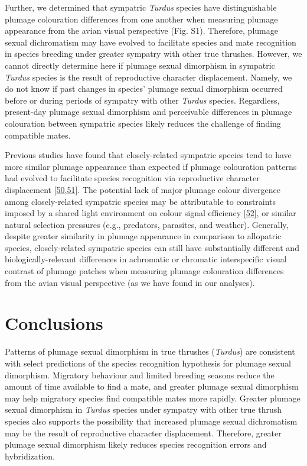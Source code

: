 \documentclass[
  a4paper,
]{article}
\begin{document}
Further, we determined that sympatric \emph{Turdus} species have
distinguishable plumage colouration differences from one another when
measuring plumage appearance from the avian visual perspective (Fig.
S1). Therefore, plumage sexual dichromatism may have evolved to
facilitate species and mate recognition in species breeding under
greater sympatry with other true thrushes. However, we cannot directly
determine here if plumage sexual dimorphism in sympatric \emph{Turdus}
species is the result of reproductive character displacement. Namely, we
do not know if past changes in species' plumage sexual dimorphism
occurred before or during periods of sympatry with other \emph{Turdus}
species. Regardless, present-day plumage sexual dimorphism and
perceivable differences in plumage colouration between sympatric species
likely reduces the challenge of finding compatible mates.

Previous studies have found that closely-related sympatric species tend
to have more similar plumage appearance than expected if plumage
colouration patterns had evolved to facilitate species recognition via
reproductive character displacement
{[}\protect\hyperlink{ref-simpson2021}{50},\protect\hyperlink{ref-miller2019}{51}{]}.
The potential lack of major plumage colour divergence among
closely-related sympatric species may be attributable to constraints
imposed by a shared light environment on colour signal efficiency
{[}\protect\hyperlink{ref-mcnaught2002}{52}{]}, or similar natural
selection pressures (e.g., predators, parasites, and weather).
Generally, despite greater similarity in plumage appearance in
comparison to allopatric species, closely-related sympatric species can
still have substantially different and biologically-relevant differences
in achromatic or chromatic interspecific visual contrast of plumage
patches when measuring plumage colouration differences from the avian
visual perspective (as we have found in our analyses).

\hypertarget{conclusions}{%
\section{Conclusions}\label{conclusions}}

Patterns of plumage sexual dimorphism in true thrushes (\emph{Turdus})
are consistent with select predictions of the species recognition
hypothesis for plumage sexual dimorphism. Migratory behaviour and
limited breeding seasons reduce the amount of time available to find a
mate, and greater plumage sexual dimorphism may help migratory species
find compatible mates more rapidly. Greater plumage sexual dimorphism in
\emph{Turdus} species under sympatry with other true thrush species also
supports the possibility that increased plumage sexual dichromatism may
be the result of reproductive character displacement. Therefore, greater
plumage sexual dimorphism likely reduces species recognition errors and
hybridization.
\end{document}
